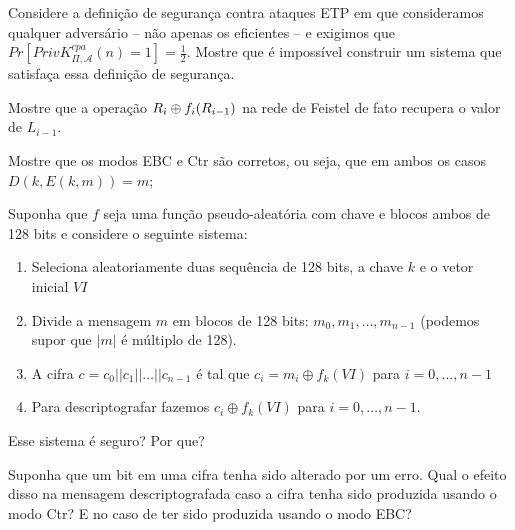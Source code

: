 \begin{exercicio}
  Considere a definição de segurança contra ataques ETP em que consideramos qualquer adversário -- não apenas os eficientes -- e exigimos que $Pr[PrivK^{cpa}_{\Pi,\mathcal{A}}(n) = 1] = \frac{1}{2}$.
  Mostre que é impossível construir um sistema que satisfaça essa definição de segurança.
\end{exercicio}

\begin{exercicio}
Mostre que a operação $R_i \oplus f_i(R_{i-1})$ na rede de Feistel de fato recupera o valor de $L_{i-1}$.
\end{exercicio}

\begin{exercicio}
  Mostre que os modos EBC e Ctr são corretos, ou seja, que em ambos os casos $D(k, E(k,m)) = m$;
\end{exercicio}

\begin{exercicio}
  Suponha que $f$ seja uma função pseudo-aleatória com chave e blocos ambos de 128 bits e considere o seguinte sistema:
  \begin{enumerate}
  \item Seleciona aleatoriamente duas sequência de 128 bits, a chave $k$ e o vetor inicial $VI$
  \item Divide a mensagem $m$ em blocos de 128 bits: $m_0, m_1, \dots, m_{n-1}$ (podemos supor que $|m|$ é múltiplo de 128).
  \item A cifra $c = c_0 || c_1 || \dots || c_{n-1}$ é tal que $c_i = m_i \oplus f_k(VI)$ para $i = 0, ..., n-1$
  \item Para descriptografar fazemos $c_i \oplus f_k(VI)$ para $i = 0, \dots, n-1$.
  \end{enumerate}
  Esse sistema é seguro? Por que?
\end{exercicio}

\begin{exercicio}
Suponha que um bit em uma cifra tenha sido alterado por um erro.
Qual o efeito disso na mensagem descriptografada caso a cifra tenha sido produzida usando o modo Ctr? E no caso de ter sido produzida usando o modo EBC?  
\end{exercicio}



